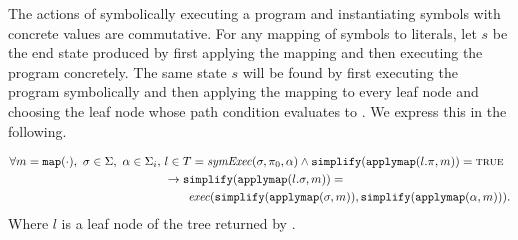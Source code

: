\begin{property}[Commutativity]
  \label{prop:kingcommutativity}
  The actions of symbolically executing a program and instantiating symbols with
  concrete values are commutative. For any mapping of symbols to literals, let
  $s$ be the end state produced by first applying the mapping and then executing
  the program concretely. The
  same state $s$ will be found by first executing the program symbolically and
  then applying the mapping to every leaf node and choosing the leaf node whose path condition
  evaluates to \texttrue. We express this in the following.





\begin{align*}
\forall m = \mathtt{map(\cdot)},~\sigma \in \Sigma,~\alpha \in \Sigma_i,~& l \in T = \mathit{symExec}(\sigma,\pi_0,\alpha) \wedge
\mathtt{simplify}(\mathtt{applymap}(l.\pi,m)) = \mathtt{\textsc{true}} \\
&\rightarrow \mathtt{simplify}(\mathtt{applymap}(l.\sigma,m)) = \\
&\qquad\mathit{exec}(\mathtt{simplify}(\mathtt{applymap}(\sigma,m)),\mathtt{simplify}(\mathtt{applymap}(\alpha,m))).
\end{align*}
Where $l$ is a leaf node of the tree returned by \symexecution.


\end{property}



